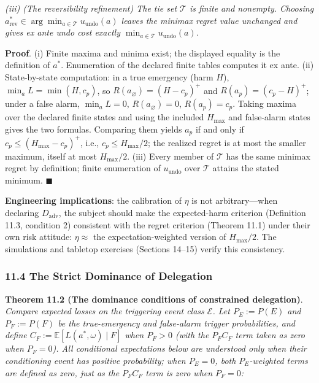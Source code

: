 \documentclass[
  11pt]{article}
\begin{document}
\emph{(iii) (The reversibility refinement) The tie set \(\mathcal T\) is
finite and nonempty. Choosing
\(a_{\mathrm{rev}}^*\in\arg\min_{a\in\mathcal T}u_{\mathrm{undo}}(a)\)
leaves the minimax regret value unchanged and gives ex ante undo cost
exactly \(\min_{a\in\mathcal T}u_{\mathrm{undo}}(a)\).}

\textbf{Proof}. (i) Finite maxima and minima exist; the displayed
equality is the definition of \(a^*\). Enumeration of the declared
finite tables computes it ex ante. (ii) State-by-state computation: in a
true emergency (harm \(H\)), \(\min_a L = \min(H, c_p)\), so
\(R(a_\varnothing) = (H - c_p)^+\) and \(R(a_p) = (c_p - H)^+\); under a
false alarm, \(\min_a L = 0\), \(R(a_\varnothing) = 0\),
\(R(a_p) = c_p\). Taking maxima over the declared finite states and
using the included \(H_{\max}\) and false-alarm states gives the two
formulas. Comparing them yields \(a_p\) if and only if
\(c_p \le (H_{\max}-c_p)^+\), i.e., \(c_p \le H_{\max}/2\); the realized
regret is at most the smaller maximum, itself at most \(H_{\max}/2\).
(iii) Every member of \(\mathcal T\) has the same minimax regret by
definition; finite enumeration of \(u_{\mathrm{undo}}\) over
\(\mathcal T\) attains the stated minimum. \(\blacksquare\)

\textbf{Engineering implications}: the calibration of \(\eta\) is not
arbitrary---when declaring \(D_{\mathrm{adv}}\), the subject should make
the expected-harm criterion (Definition 11.3, condition 2) consistent
with the regret criterion (Theorem 11.1) under their own risk attitude:
\(\eta \approx\) the expectation-weighted version of \(H_{\max}/2\). The
simulations and tabletop exercises (Sections 14--15) verify this
consistency.

\subsubsection{11.4 The Strict Dominance of
Delegation}\label{the-strict-dominance-of-delegation}

\textbf{Theorem 11.2 (The dominance conditions of constrained
delegation)}. \emph{Compare expected losses on the triggering event
class \(\mathcal{E}\). Let \(P_E:=P(E)\) and \(P_F:=P(F)\) be the
true-emergency and false-alarm trigger probabilities, and define
\(C_F:=\mathbb E[L(a^*,\omega)\mid F]\) when \(P_F>0\) (with the
\(P_FC_F\) term taken as zero when \(P_F=0\)). All conditional
expectations below are understood only when their conditioning event has
positive probability; when \(P_E=0\), both \(P_E\)-weighted terms are
defined as zero, just as the \(P_FC_F\) term is zero when \(P_F=0\):}
\end{document}
